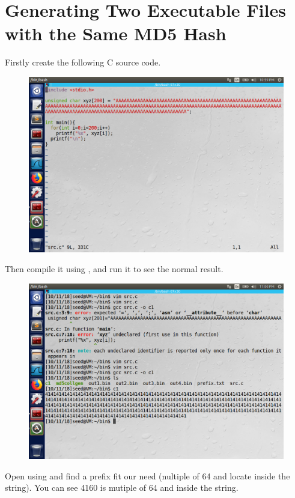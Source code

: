 \documentclass{article}
\begin{document}
\section{Generating Two Executable Files with the Same MD5 Hash}
Firstly create the following  C source code.
\begin{figure}[H]\centering\includegraphics[width=\textwidth]{ss/09.png}\end{figure}
Then compile it using , and run it to see the normal result.
\begin{figure}[H]\centering\includegraphics[width=\textwidth]{ss/10.png}\end{figure}
Open  using  and find a prefix fit our need (nultiple of 64 and locate inside the string). You can see 4160 is mutiple of 64 and inside the string.
\end{document}
